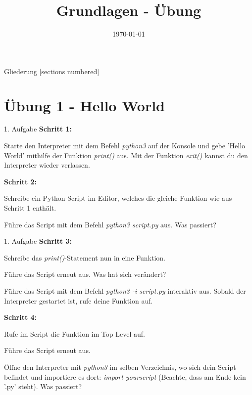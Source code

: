 



\title{Grundlagen - Übung}
\date{\today}




\maketitle

\begin{frame}{Gliederung}
	[sections numbered]
	\tableofcontents
\end{frame}


\section{Übung 1 - Hello World}

\begin{frame}{1. Aufgabe}
	\textbf{Schritt 1:}
	
	Starte den Interpreter mit dem Befehl \textit{python3} auf der Konsole und gebe 'Hello World' mithilfe der Funktion \textit{print()} aus. Mit der Funktion \textit{exit()} kannst du den Interpreter wieder verlassen.
\linebreak

	\textbf{Schritt 2:}
	
	Schreibe ein Python-Script im Editor, welches die gleiche Funktion wie aus Schritt 1 enthält.
	
	Führe das Script mit dem Befehl \textit{python3 script.py} aus. Was passiert?
	
\end{frame}

\begin{frame}{1. Aufgabe}
	\textbf{Schritt 3:}
	
	Schreibe das \textit{print()}-Statement nun in eine Funktion.
	
	Führe das Script erneut aus. Was hat sich verändert?
	
	Führe das Script mit dem Befehl \textit{python3 -i script.py} interaktiv aus. Sobald der Interpreter gestartet ist, rufe deine Funktion auf. 
\linebreak

	\textbf{Schritt 4:}
	
	Rufe im Script die Funktion im Top Level auf.
	
	Führe das Script erneut aus.
	
	Öffne den Interpreter mit \textit{python3} im selben Verzeichnis, wo sich dein Script befindet und importiere es dort: \textit{import yourscript} (Beachte, dass am Ende kein ’.py’ steht). Was passiert?
	
\end{frame}

